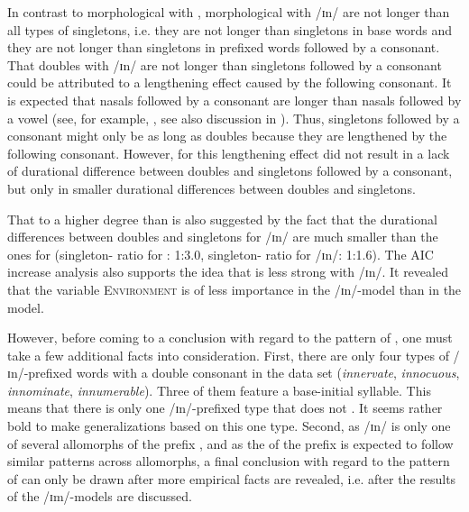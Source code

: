 In contrast to morphological  with , 
morphological  with /ɪn/ are not longer than all types of singletons, i.e. they are not longer than singletons in base words and they are not longer than singletons in prefixed words followed by a consonant. 
That doubles with /ɪn/ are not longer than singletons followed by a consonant could be attributed to a lengthening effect caused by the following consonant.
It is expected that nasals followed by a consonant are longer than nasals followed by a vowel (see, for example, \citealt{Umeda.1977}, see also discussion in ).  Thus, singletons followed by a consonant might only be as long as doubles because they are lengthened by the following consonant. However, for  this lengthening effect did not result in a lack of durational difference between doubles and singletons followed by a consonant, but only in smaller durational differences between doubles and singletons.  

That   to a higher degree than  is also suggested by the fact that the durational differences between doubles and singletons for /ɪn/ are much smaller than the ones for  (singleton- ratio for : 1:3.0, singleton- ratio for /ɪn/: 1:1.6). 
The AIC increase analysis also supports the idea that  is less strong with /ɪn/. It revealed that the variable \textsc{Environment} is of less importance in the /ɪn/-model than in the model.




However, before coming to a conclusion with regard to the  pattern of , one must take a few additional facts into consideration. 
First, there are only four types of /ɪn/-prefixed words with a double consonant in the data set (\textit{innervate}, \textit{innocuous}, \textit{innominate}, \textit{innumerable}). Three of them feature a  base-initial syllable. This means that there is only one /ɪn/-prefixed type that does not . It seems rather bold to make generalizations based on this one type. 
Second, as /ɪn/ is only one of several allomorphs of the prefix , and as the  of the prefix  is expected to follow similar patterns across allomorphs, 
a final conclusion with regard to the  pattern of  can only be drawn after more empirical facts are revealed, i.e. after the results of the /ɪm/-models are discussed.
%


